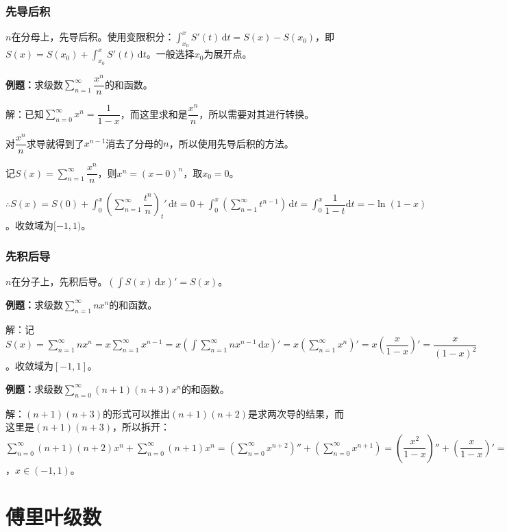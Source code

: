 \documentclass[UTF8, 12pt]{ctexart}
\begin{document}
\subsubsection{先导后积}

$n$在分母上，先导后积。使用变限积分：$\int_{x_0}^xS'(t)\,\textrm{d}t=S(x)-S(x_0)$，即$S(x)=S(x_0)+\int_{x_0}^xS'(t)\,\textrm{d}t$。一般选择$x_0$为展开点。

\textbf{例题：}求级数$\sum\limits_{n=1}^\infty\dfrac{x^n}{n}$的和函数。

解：已知$\sum\limits_{n=0}^\infty x^n=\dfrac{1}{1-x}$，而这里求和是$\dfrac{x^n}{n}$，所以需要对其进行转换。

对$\dfrac{x^n}{n}$求导就得到了$x^{n-1}$消去了分母的$n$，所以使用先导后积的方法。

记$S(x)=\sum\limits_{n=1}^\infty\dfrac{x^n}{n}$，则$x^n=(x-0)^n$，取$x_0=0$。

$\therefore S(x)=S(0)+\displaystyle{\int_0^x\left(\sum\limits_{n=1}^\infty\dfrac{t^n}{n}\right)_t'\,\textrm{d}t}=0+\int_0^x(\sum\limits_{n=1}^\infty t^{n-1})\,\textrm{d}t=\displaystyle{\int_0^x\dfrac{1}{1-t}\textrm{d}t}=-\ln(1-x)$。收敛域为$[-1,1)$。

\subsubsection{先积后导}

$n$在分子上，先积后导。$(\int S(x)\,\textrm{d}x)'=S(x)$。

\textbf{例题：}求级数$\sum\limits_{n=1}^\infty nx^n$的和函数。

解：记$S(x)=\sum\limits_{n=1}^\infty nx^n=x\sum\limits_{n=1}^\infty x^{n-1}=x(\int\sum\limits_{n=1}^\infty nx^{n-1}\,\textrm{d}x)'=x(\sum\limits_{n=1}^\infty x^n)'=x\left(\dfrac{x}{1-x}\right)'=\dfrac{x}{(1-x)^2}$。收敛域为$[-1,1]$。

\textbf{例题：}求级数$\sum\limits_{n=0}^\infty(n+1)(n+3)x^n$的和函数。

解：$(n+1)(n+3)$的形式可以推出$(n+1)(n+2)$是求两次导的结果，而这里是$(n+1)(n+3)$，所以拆开：$\sum\limits_{n=0}^\infty(n+1)(n+2)x^n+\sum\limits_{n=0}^\infty(n+1)x^n=\left(\sum\limits_{n=0}^\infty x^{n+2}\right)''+\left(\sum\limits_{n=0}^\infty x^{n+1}\right)=\left(\dfrac{x^2}{1-x}\right)''+\left(\dfrac{x}{1-x}\right)'=\dfrac{3-x}{(1-x)^3}$，$x\in(-1,1)$。

\section{傅里叶级数}
\end{document}
